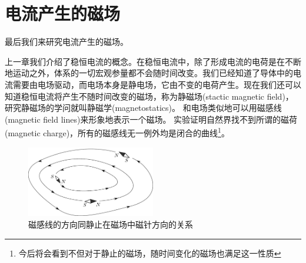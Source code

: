 \section{电流产生的磁场}
最后我们来研究电流产生的磁场。

上一章我们介绍了稳恒电流的概念。在稳恒电流中，除了形成电流的电荷是在不断地运动之外，体系的一切宏观参量都不会随时间改变。我们已经知道了导体中的电流需要由电场驱动，而电场本身是静电场，它由不变的电荷产生。现在我们还可以知道稳恒电流将产生不随时间改变的磁场，称为{\heiti 静磁场}(stactic magnetic field)，研究静磁场的学问就叫{\heiti 静磁学}(magnetostatics)。
和电场类似地可以用{\heiti 磁感线}(magnetic field lines)来形象地表示一个磁场。
实验证明自然界找不到所谓的{\heiti 磁荷}(magnetic charge)，所有的磁感线无一例外均是闭合的曲线\footnote{今后将会看到不但对于静止的磁场，随时间变化的磁场也满足这一性质}。

\begin{figure}[hbtp]
\centering
\includegraphics[width=0.5\textwidth]{images/mag-5.pdf}
\caption{磁感线的方向同静止在磁场中磁针方向的关系}
\end{figure}

